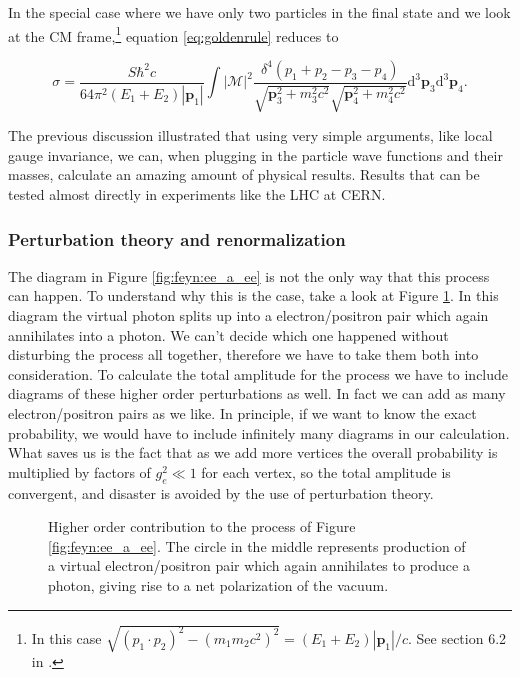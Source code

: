 In the special case where we have only two particles in the final state and we look at the CM frame,\footnote{In this case $\sqrt{(p_1\cdot p_2)^2 - (m_1m_2 c^2)^2} = (E_1+E_2)|\mathbf{p}_1|/c$. See section 6.2 in \cite{griffiths1987iep}.} equation \eqref{eq:goldenrule} reduces to \cite{griffiths1987iep}

\begin{equation}
	\sigma = \frac{S\hbar^2c}{64\pi^2(E_1+E_2)|\mathbf{p}_1|} \int | \mathcal{M} |^2
	\frac{\delta^4(p_1+p_2-p_3-p_4)}{\sqrt{\mathbf{p}_3^2+m_3^2c^2}\sqrt{\mathbf{p}_4^2+m_4^2c^2}} \textrm{d}^3\mathbf{p}_3\textrm{d}^3\mathbf{p}_4.
\end{equation}

The previous discussion illustrated that using very simple arguments, like local gauge invariance, we can, when plugging in the particle wave functions and their masses, calculate an amazing amount of physical results. Results that can be tested almost directly in experiments like the LHC at CERN.

\subsubsection{Perturbation theory and renormalization}
The diagram in Figure \ref{fig:feyn:ee_a_ee} is not the only way that this process can happen. To understand why this is the case, take a look at Figure \ref{fig:feyn:ee_a_ee_2}. In this diagram the virtual photon splits up into a electron/positron pair which again annihilates into a photon. We can't decide which one happened without disturbing the process all together, therefore we have to take them both into consideration. To calculate the total amplitude for the process we have to include diagrams of these higher order perturbations as well. In fact we can add as many electron/positron pairs as we like. In principle, if we want to know the exact probability, we would have to include infinitely many diagrams in our calculation. What saves us is the fact that as we add more vertices the overall probability is multiplied by factors of $g_e^2 \ll 1$ for each vertex, so the total amplitude is convergent, and disaster is avoided by the use of perturbation theory.

\begin{figure}[htp]
\centering
	
\caption{Higher order contribution to the process of Figure \ref{fig:feyn:ee_a_ee}. The circle in the middle represents production of a virtual electron/positron pair which again annihilates to produce a photon, giving rise to a net polarization of the vacuum.} \label{fig:feyn:ee_a_ee_2}
\end{figure}

